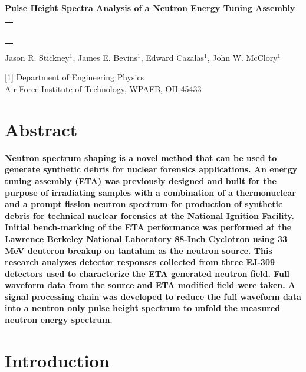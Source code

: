 \documentclass[twocolumn,10pt,final]{asme2ej}
\begin{document}
\begin{center}

\textbf{\large{Pulse Height Spectra Analysis of a Neutron Energy Tuning Assembly}}

\noindent
\begin{tabular}{l}
\rule{3.2in}{0.02in}
\end{tabular}

{Jason R. Stickney$^1$, James E. Bevins$^1$, Edward Cazalas$^1$, John W. McClory$^1$}
\vspace{0.1in}

{[1] Department of Engineering Physics\\
	Air Force Institute of Technology,	WPAFB, OH 45433\\}

\end{center}

\vspace{-0.5 cm}
\section*{Abstract}
\textbf{
Neutron spectrum shaping is a novel method that can be used to generate synthetic debris for nuclear forensics applications.  
An energy tuning assembly (ETA) was previously designed and built for the purpose of irradiating samples with a combination of a thermonuclear and a prompt fission neutron spectrum for production of synthetic debris for technical nuclear forensics at the National Ignition Facility. 
Initial bench-marking of the ETA performance was performed at the Lawrence Berkeley National Laboratory 88-Inch Cyclotron using 33 MeV deuteron breakup on tantalum as the neutron source.  
This research analyzes detector responses collected from three EJ-309 detectors used to characterize the ETA generated neutron field.   
Full waveform data from the source and ETA modified field were taken.  
A signal processing chain was developed to reduce the full waveform data into a neutron only pulse height spectrum to unfold the measured neutron energy spectrum.}


\vspace{-0.4 cm}
\section{Introduction} \label{intro}
\end{document}
